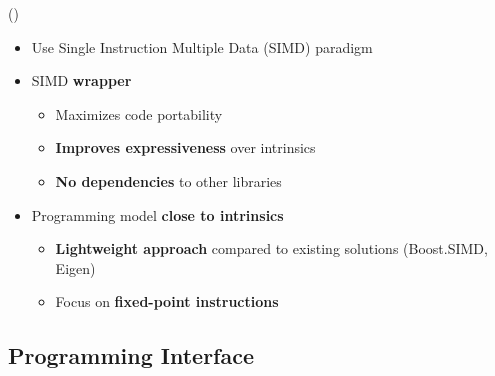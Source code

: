\begin{frame}{\longMIPP (\MIPP)}
  \vspace{0.1cm}
  \begin{itemize}
    \item<2-> Use Single Instruction Multiple Data (SIMD) paradigm
    \item<3-> SIMD \textbf{\Cxx wrapper}
    \begin{itemize}
      \item<3-> Maximizes code portability
      \item<3-> \textbf{Improves expressiveness} over intrinsics
      \item<3-> \textbf{No dependencies} to other libraries
    \end{itemize}
    \item<4-> Programming model \textbf{close to intrinsics}
    \begin{itemize}
      \item<4-> \textbf{Lightweight approach} compared to existing solutions (Boost.SIMD, Eigen)
      \item<4-> Focus on \textbf{fixed-point instructions}
    \end{itemize}
  \end{itemize}
  \vfill
\end{frame}

\subsection[Programming Interface]{Programming Interface}

